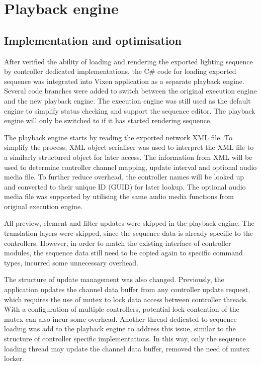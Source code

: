 \chapter{Playback engine}
\renewcommand{\baselinestretch}{\mystretch}
\label{chap:Playback}

\section{Implementation and optimisation}

After verified the ability of loading and rendering the exported lighting sequence by controller dedicated implementations, the C\# code for loading exported sequence was integrated into Vixen application as a separate playback engine. Several code branches were added to switch between the original execution engine and the new playback engine. The execution engine was still used as the default engine to simplify status checking and support the sequence editor. The playback engine will only be switched to if it has started rendering sequence.

The playback engine starts by reading the exported network XML file. To simplify the process, XML object serialiser was used to interpret the XML file to a similarly structured object for later access. The information from XML will be used to determine controller channel mapping, update interval and optional audio media file. To further reduce overhead, the controller names will be looked up and converted to their unique ID (GUID) for later lookup. The optional audio media file was supported by utilising the same audio media functions from original execution engine.

All preview, element and filter updates were skipped in the playback engine. The translation layers were skipped, since the sequence data is already specific to the controllers. However, in order to match the existing interface of controller modules, the sequence data still need to be copied again to specific command types, incurred some unnecessary overhead.

The structure of update management was also changed. Previously, the application updates the channel data buffer from any controller update request, which requires the use of mutex to lock data access between controller threads. With a configuration of multiple controllers, potential lock contention of the mutex can also incur some overhead. Another thread dedicated to sequence loading was add to the playback engine to address this issue, similar to the structure of controller specific implementations. In this way, only the sequence loading thread may update the channel data buffer, removed the need of mutex locker.

